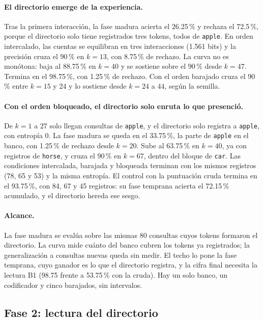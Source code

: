 \paragraph{El directorio emerge de la experiencia.}
Tras la primera interacción, la fase madura acierta el 26.25\,\% y rechaza el 72.5\,\%,
porque el directorio solo tiene registrados tres tokens, todos de \texttt{apple}.
En orden intercalado, las cuentas se equilibran en tres interacciones (1.561 bits) y la
precisión cruza el 90\,\% en $k = 13$, con 8.75\,\% de rechazo.
La curva no es monótona: baja al 88.75\,\% en $k = 40$ y se sostiene sobre el 90\,\%
desde $k = 47$.
Termina en el 98.75\,\%, con 1.25\,\% de rechazo.
Con el orden barajado cruza el 90\,\% entre $k = 15$ y $24$ y lo sostiene desde
$k = 24$ a $44$, según la semilla.

\paragraph{Con el orden bloqueado, el directorio solo enruta lo que presenció.}
De $k = 1$ a $27$ solo llegan consultas de \texttt{apple}, y el directorio solo registra
a \texttt{apple}, con entropía 0.
La fase madura se queda en el 33.75\,\%, la parte de \texttt{apple} en el banco, con
1.25\,\% de rechazo desde $k = 20$.
Sube al 63.75\,\% en $k = 40$, ya con registros de \texttt{horse}, y cruza el 90\,\% en
$k = 67$, dentro del bloque de \texttt{car}.
Las condiciones intercalada, barajada y bloqueada terminan con los mismos registros
(78, 65 y 53) y la misma entropía.
El control con la puntuación cruda termina en el 93.75\,\%, con 84, 67 y 45 registros:
su fase temprana acierta el 72.15\,\% acumulado, y el directorio hereda ese sesgo.

\paragraph{Alcance.}
La fase madura se evalúa sobre las mismas 80 consultas cuyos tokens formaron el
directorio.
La curva mide cuánto del banco cubren los tokens ya registrados; la generalización a
consultas nuevas queda sin medir.
El techo lo pone la fase temprana, cuyo ganador es lo que el directorio registra, y la
cifra final necesita la lectura B1 (98.75 frente a 53.75\,\% con la cruda).
Hay un solo banco, un codificador y cinco barajados, sin intervalos.

\subsection{Fase 2: lectura del directorio}
\label{sec:fase2-resultados}

